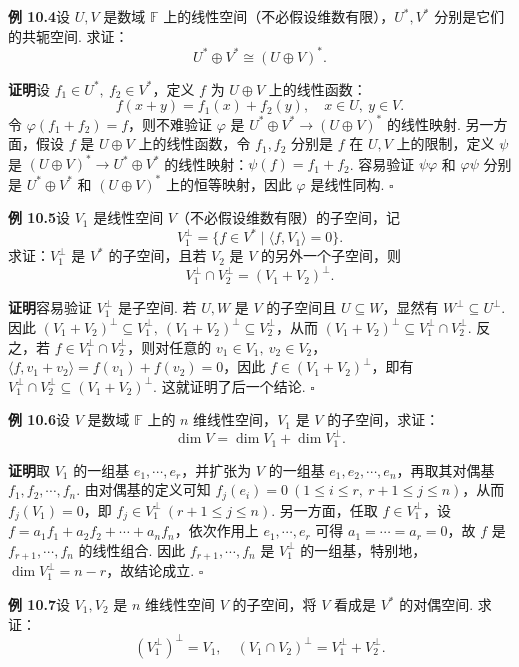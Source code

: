 \documentclass[UTF8,12pt,a4paper,fontset=fandol]{ctexart}
\begin{document}
\noindent\textbf{例 10.4}\quad 设 $U,V$ 是数域 $\mathbb{F}$ 上的线性空间（不必假设维数有限），$U^*,V^*$ 分别是它们的共轭空间. 求证：
\[
U^*\oplus V^*\cong (U\oplus V)^*.
\]

\noindent\textbf{证明}\quad 设 $f_1\in U^*,\ f_2\in V^*$，定义 $f$ 为 $U\oplus V$ 上的线性函数：
\[
f(x+y)=f_1(x)+f_2(y),\quad x\in U,\ y\in V.
\]
令 $\varphi(f_1+f_2)=f$，则不难验证 $\varphi$ 是 $U^*\oplus V^*\to (U\oplus V)^*$ 的线性映射. 另一方面，假设 $f$ 是 $U\oplus V$ 上的线性函数，令 $f_1,f_2$ 分别是 $f$ 在 $U,V$ 上的限制，定义 $\psi$ 是 $(U\oplus V)^*\to U^*\oplus V^*$ 的线性映射：$\psi(f)=f_1+f_2$. 容易验证 $\psi\varphi$ 和 $\varphi\psi$ 分别是 $U^*\oplus V^*$ 和 $(U\oplus V)^*$ 上的恒等映射，因此 $\varphi$ 是线性同构. $\square$

\noindent\textbf{例 10.5}\quad 设 $V_1$ 是线性空间 $V$（不必假设维数有限）的子空间，记
\[
V_1^\perp=\{f\in V^*\mid \langle f,V_1\rangle=0\}.
\]
求证：$V_1^\perp$ 是 $V^*$ 的子空间，且若 $V_2$ 是 $V$ 的另外一个子空间，则
\[
V_1^\perp\cap V_2^\perp=(V_1+V_2)^\perp.
\]

\noindent\textbf{证明}\quad 容易验证 $V_1^\perp$ 是子空间. 若 $U,W$ 是 $V$ 的子空间且 $U\subseteq W$，显然有 $W^\perp\subseteq U^\perp$. 因此 $(V_1+V_2)^\perp\subseteq V_1^\perp,\ (V_1+V_2)^\perp\subseteq V_2^\perp$，从而 $(V_1+V_2)^\perp\subseteq V_1^\perp\cap V_2^\perp$. 反之，若 $f\in V_1^\perp\cap V_2^\perp$，则对任意的 $v_1\in V_1,\ v_2\in V_2$，$\langle f,v_1+v_2\rangle=f(v_1)+f(v_2)=0$，因此 $f\in(V_1+V_2)^\perp$，即有 $V_1^\perp\cap V_2^\perp\subseteq (V_1+V_2)^\perp$. 这就证明了后一个结论. $\square$

\noindent\textbf{例 10.6}\quad 设 $V$ 是数域 $\mathbb{F}$ 上的 $n$ 维线性空间，$V_1$ 是 $V$ 的子空间，求证：
\[
\dim V=\dim V_1+\dim V_1^\perp.
\]

\noindent\textbf{证明}\quad 取 $V_1$ 的一组基 $e_1,\cdots,e_r$，并扩张为 $V$ 的一组基 $e_1,e_2,\cdots,e_n$，再取其对偶基 $f_1,f_2,\cdots,f_n$. 由对偶基的定义可知 $f_j(e_i)=0\ (1\le i\le r,\ r+1\le j\le n)$，从而 $f_j(V_1)=0$，即 $f_j\in V_1^\perp\ (r+1\le j\le n)$. 另一方面，任取 $f\in V_1^\perp$，设 $f=a_1f_1+a_2f_2+\cdots+a_nf_n$，依次作用上 $e_1,\cdots,e_r$ 可得 $a_1=\cdots=a_r=0$，故 $f$ 是 $f_{r+1},\cdots,f_n$ 的线性组合. 因此 $f_{r+1},\cdots,f_n$ 是 $V_1^\perp$ 的一组基，特别地，$\dim V_1^\perp=n-r$，故结论成立. $\square$

\noindent\textbf{例 10.7}\quad 设 $V_1,V_2$ 是 $n$ 维线性空间 $V$ 的子空间，将 $V$ 看成是 $V^*$ 的对偶空间. 求证：
\[
(V_1^\perp)^\perp=V_1,\quad (V_1\cap V_2)^\perp=V_1^\perp+V_2^\perp.
\]
\end{document}
